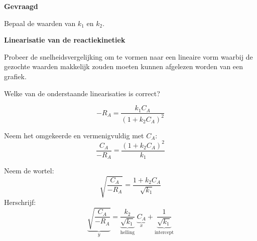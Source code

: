 \documentclass{ximera}
\begin{document}
\textbf{Gevraagd}

Bepaal de waarden van $k_1$ en $k_2$.

\begin{question} \textbf{Linearisatie van de reactiekinetiek}

Probeer de snelheidsvergelijking om te vormen naar een lineaire vorm waarbij de gezochte waarden makkelijk zouden moeten kunnen afgelezen worden van een grafiek.

Welke van de onderstaande linearisaties is correct?
\begin{multipleChoice}



\begin{feedback}
    \[
    - R_A = \frac{k_1 C_A}{(1 + k_2 C_A)^2}
    \]
    
    Neem het omgekeerde en vermenigvuldig met $C_A$:
    \[
    \frac{C_A}{-R_A} = \frac{(1 + k_2 C_A)^2}{k_1}
    \]
    
    Neem de wortel:
    \[
    \sqrt{\frac{C_A}{-R_A}} = \frac{1 + k_2 C_A}{\sqrt{k_1}}
    \]
    Herschrijf:
    \[
    \underbrace{\sqrt{\frac{C_A}{-R_A}}}_{y}
    =
    \underbrace{\frac{k_2}{\sqrt{k_1}}}_{\text{helling}}
    \;
    \underbrace{C_A}_{x}
    +
    \underbrace{\frac{1}{\sqrt{k_1}}}_{\text{intercept}}
    \]
\end{feedback}
\end{multipleChoice}
\end{question}
\end{document}
